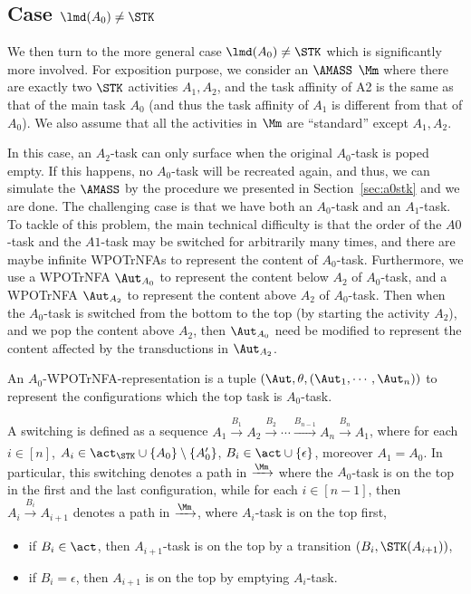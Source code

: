 \subsection{Case $\lmd(A_0)\neq\STK$}\label{sec:a0nostk}

We then turn to the more general case $\lmd(A_0)\neq\STK$ which is significantly more involved.
For exposition purpose, we consider an $\AMASS$ $\Mm$ where there are exactly two $\STK$ activities $A_1,A_2$, and the task affinity of A2 is the same as that of the main task $A_0$ (and thus the task affinity of $A_1$ is different from that of $A_0$). We also assume that all the activities in $\Mm$ are “standard” except $A_1,A_2$.

In this case, an $A_2$-task can only surface when the original $A_0$-task is poped empty. If this happens, no $A_0$-task will be recreated again, and thus, we can simulate the $\AMASS$ by the procedure we presented in Section~\ref{sec:a0stk} and we are done. The challenging case is that we have both an $A_0$-task and an $A_1$-task. To tackle of this problem, the main technical difficulty is that the order of the $A0$-task and the $A1$-task may be switched for arbitrarily many times, and there are maybe infinite WPOTrNFAs to represent the content of $A_0$-task. Furthermore, we use a WPOTrNFA $\Aut_{A_0}$ to represent the content below $A_2$ of $A_0$-task, and a WPOTrNFA $\Aut_{A_2}$ to represent the content above $A_2$ of $A_0$-task. Then when the $A_0$-task is switched from the bottom to the top (by starting the activity $A_2$), and we pop the content above $A_2$, then $\Aut_{A_0}$ need be modified to represent the content affected by the transductions in $\Aut_{A_2}$.

\begin{definition}
    An $A_0$-WPOTrNFA-representation is a tuple $(\Aut,\theta,(\Aut_1,\cdots,\Aut_n))$ to represent the configurations which the top task is $A_0$-task.
\end{definition}

\begin{definition}
    A switching is defined as a sequence $A_1\xrightarrow[]{B_1}A_2\xrightarrow[]{B_2}\cdots\xrightarrow[]{B_{n-1}}A_n\xrightarrow[]{B_n}A_1$, where for each $i\in[n]$, $A_i\in\act_{\STK}\cup\{A_0\}\setminus\{A_0'\}$, $B_i\in\act\cup\{\epsilon\}$, moreover $A_1=A_0$.
    In particular, this switching denotes a path in $\xrightarrow[]{\Mm}$ where the $A_0$-task is on the top in the first and the last configuration, while for each $i\in[n-1]$, then $A_i\xrightarrow[]{B_i}A_{i+1}$ denotes a path in $\xrightarrow[]{\Mm}$, where $A_i$-task is on the top first, 
    \begin{itemize}
        \item if $B_i\in\act$, then $A_{i+1}$-task is on the top by a transition $(B_i,\STK(A_{i+1}))$,
        \item if $B_i=\epsilon$, then $A_{i+1}$ is on the top by emptying $A_i$-task.
    \end{itemize}

\end{definition}

